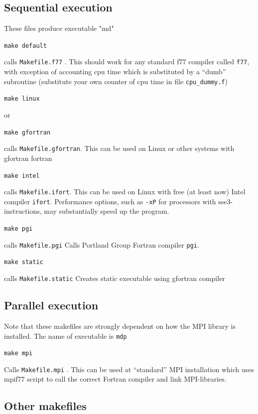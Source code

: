 \documentclass{article}
\begin{document}
\subsection{Sequential execution} 

These files produce executable "md"

\verb|make default| 

calls \verb|Makefile.f77| .  This should work for any standard f77 
compiler called \verb|f77|, with exception of accounting cpu time which 
is substituted by  a ``dumb'' subroutine (substitute your own counter of 
cpu time in file  \verb|cpu_dummy.f|)

\verb|make linux|

or

\verb|make gfortran|

calls  \verb|Makefile.gfortran|. This can be  used  on Linux or other systems 
with gfortran fortran  

\verb|make intel|

calls  \verb|Makefile.ifort|. This can be  used  on Linux with free (at 
least now) Intel compiler \verb|ifort|. Performance options, such as 
\verb|-xP| for processors with sse3-instructions, may substantially 
speed up the program.

\verb|make pgi|

calls \verb|Makefile.pgi|  Calls Portland Group Fortran compiler \verb|pgi|.

\verb|make static|

calls \verb|Makefile.static|  Creates static executable using gfortran compiler
   

\subsection{Parallel execution} 

Note that these makefiles are strongly dependent on how
the MPI library is installed. The name of executable is \verb|mdp|

\verb|make mpi|

Calls   \verb|Makefile.mpi| .  This can be used at ``standard'' MPI 
installation which uses mpif77 script to call the correct Fortran
compiler and link MPI-libraries. 



\subsection{Other makefiles}
\end{document}
